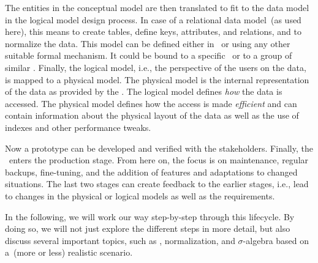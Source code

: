 The entities in the conceptual model are then translated to fit to the data model in the logical model design process.
In case of a relational data model~(as used here), this means to create tables, define keys, attributes, and relations, and to normalize the data.
This model can be defined either in \sql\ or using any other suitable formal mechanism.
It could be bound to a specific \dbms\ or to a group of similar .
Finally, the logical model, i.e., the perspective of the users on the data, is mapped to a physical model.
The physical model is the internal representation of the data as provided by the \dbms.
The logical model defines \emph{how} the data is accessed.
The physical model defines how the access is made \emph{efficient} and can contain information about the physical layout of the data as well as the use of indexes and other performance tweaks.

Now a prototype can be developed and verified with the stakeholders.
Finally, the \db\ enters the production stage.
From here on, the focus is on maintenance, regular backups, fine-tuning, and the addition of features and adaptations to changed situations.
The last two stages can create feedback to the earlier stages, i.e., lead to changes in the physical or logical models as well as the requirements.

In the following, we will work our way step-by-step through this lifecycle.
By doing so, we will not just explore the different steps in more detail, but also discuss several important topics, such as , normalization, and $\sigma$\nobreakdashes-algebra based on a~(more or less) realistic scenario.%
%
\FloatBarrier%
\endhsection%
%
\endhsection%
%
